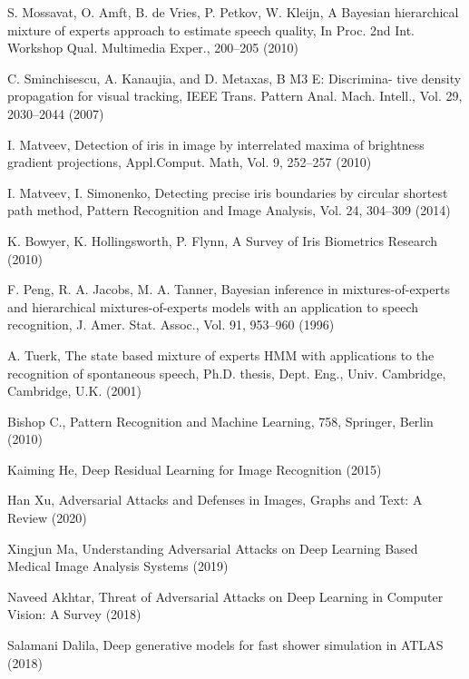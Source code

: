 \begin{thebibliography}{}
S. Mossavat, O. Amft, B. de Vries, P. Petkov, W. Kleijn, A Bayesian hierarchical mixture of experts approach to estimate speech quality, In Proc. 2nd Int. Workshop Qual. Multimedia Exper., 200--205 (2010)

C. Sminchisescu, A. Kanaujia, and D. Metaxas, B M3 E: Discrimina- tive density propagation for visual tracking, IEEE Trans. Pattern Anal. Mach. Intell., Vol. 29, 2030--2044 (2007)

I. Matveev, Detection of iris in image by interrelated maxima of brightness gradient projections, Appl.Comput. Math, Vol. 9, 252--257 (2010)

I. Matveev, I. Simonenko, Detecting precise iris boundaries by circular shortest path method, Pattern Recognition and Image Analysis, Vol. 24, 304--309 (2014)

K. Bowyer, K. Hollingsworth, P. Flynn, A Survey of Iris Biometrics Research (2010)

F. Peng, R. A. Jacobs, M. A. Tanner, Bayesian inference in mixtures-of-experts and hierarchical mixtures-of-experts models with an application to speech recognition, J. Amer. Stat. Assoc., Vol. 91, 953--960 (1996)

A. Tuerk,  The state based mixture of experts HMM with applications to the recognition of spontaneous speech, Ph.D. thesis, Dept. Eng., Univ. Cambridge, Cambridge, U.K. (2001)

Bishop C., Pattern Recognition and Machine Learning, 758, Springer, Berlin (2010)

Kaiming He, Deep Residual Learning for Image Recognition (2015)

Han Xu, Adversarial Attacks and Defenses in Images, Graphs and Text: A Review (2020)

Xingjun Ma, Understanding Adversarial Attacks on Deep Learning Based Medical Image Analysis Systems (2019)

Naveed Akhtar, Threat of Adversarial Attacks on Deep Learning in Computer Vision: A Survey (2018)

Salamani Dalila, Deep generative models for fast shower simulation in ATLAS (2018)

\end{thebibliography}



